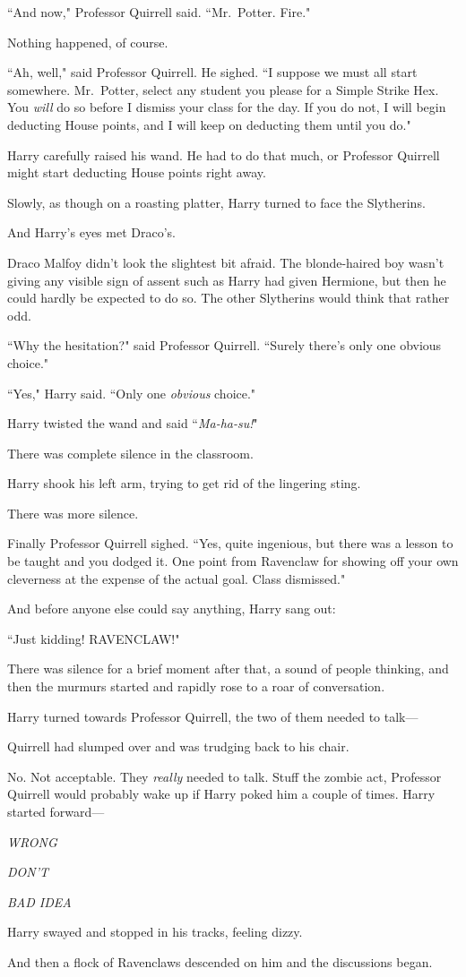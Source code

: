 ``And now," Professor Quirrell said. ``Mr.~Potter. Fire."

Nothing happened, of course.

``Ah, well," said Professor Quirrell. He sighed. ``I suppose we must all start somewhere. Mr.~Potter, select any student you please for a Simple Strike Hex. You \emph{will} do so before I dismiss your class for the day. If you do not, I will begin deducting House points, and I will keep on deducting them until you do."

Harry carefully raised his wand. He had to do that much, or Professor Quirrell might start deducting House points right away.

Slowly, as though on a roasting platter, Harry turned to face the Slytherins.

And Harry's eyes met Draco's.

Draco Malfoy didn't look the slightest bit afraid. The blonde-haired boy wasn't giving any visible sign of assent such as Harry had given Hermione, but then he could hardly be expected to do so. The other Slytherins would think that rather odd.

``Why the hesitation?" said Professor Quirrell. ``Surely there's only one obvious choice."

``Yes," Harry said. ``Only one \emph{obvious} choice."

Harry twisted the wand and said ``\emph{Ma-ha-su!}"

There was complete silence in the classroom.

Harry shook his left arm, trying to get rid of the lingering sting.

There was more silence.

Finally Professor Quirrell sighed. ``Yes, quite ingenious, but there was a lesson to be taught and you dodged it. One point from Ravenclaw for showing off your own cleverness at the expense of the actual goal. Class dismissed."

And before anyone else could say anything, Harry sang out:

``Just kidding! RAVENCLAW!"

There was silence for a brief moment after that, a sound of people thinking, and then the murmurs started and rapidly rose to a roar of conversation.

Harry turned towards Professor Quirrell, the two of them needed to talk—

Quirrell had slumped over and was trudging back to his chair.

No. Not acceptable. They \emph{really} needed to talk. Stuff the zombie act, Professor Quirrell would probably wake up if Harry poked him a couple of times. Harry started forward—

\emph{WRONG}

\emph{DON'T}

\emph{BAD IDEA}

Harry swayed and stopped in his tracks, feeling dizzy.

And then a flock of Ravenclaws descended on him and the discussions began.

